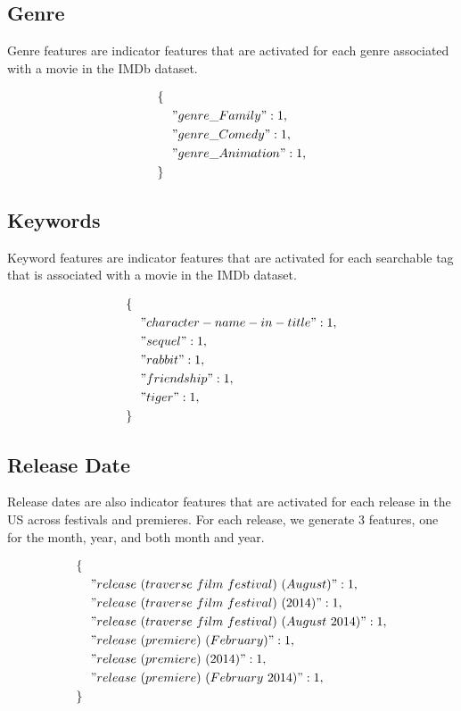 \documentclass[journal]{IEEEtran}
\begin{document}
\subsection{Genre}
Genre features are indicator features that are activated for each
genre associated with a movie in the IMDb dataset.

\begin{align*}
        \{\ \ &\\
        &"genre\_Family": 1,\\
        &"genre\_Comedy": 1,\\
        &"genre\_Animation": 1,\\
        \}\ \ &
\end{align*}

\subsection{Keywords}
Keyword features are indicator features that are activated for
each searchable tag that is associated with a movie in the
IMDb dataset.

\begin{align*}
        \{\ \ &\\
        &"character-name-in-title": 1,\\
        &"sequel": 1,\\
        &"rabbit": 1,\\
        &"friendship": 1,\\
        &"tiger": 1,\\
        \}\ \ &
\end{align*}

\subsection{Release Date}
Release dates are also indicator features that are activated for each release
in the US across festivals and premieres. For each release, we generate 3
features, one for the month, year, and both month and year.

\begin{align*}
        \{\ \ &\\
        &"release\ (traverse\ film\ festival)\ (August)": 1, \\
        &"release\ (traverse\ film\ festival)\ (2014)": 1, \\
        &"release\ (traverse\ film\ festival)\ (August\ 2014)": 1, \\
        &"release\ (premiere)\ (February)": 1, \\
        &"release\ (premiere)\ (2014)": 1, \\
        &"release\ (premiere)\ (February\ 2014)": 1, \\
        \}\ \ &
\end{align*}
\end{document}
